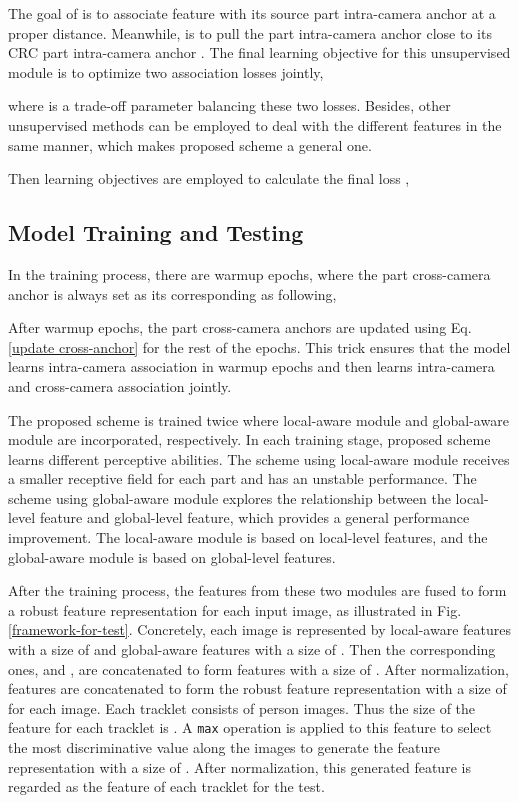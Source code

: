 \documentclass{cta-author}
\begin{document}
	The goal of  is to associate feature  with its source part intra-camera anchor  at a proper distance. Meanwhile,  is to pull the part intra-camera anchor  close to its CRC part intra-camera anchor . The final learning objective for this unsupervised module is to optimize two association losses jointly,
	
	where  is a trade-off parameter balancing these two losses. Besides, other unsupervised methods can be employed to deal with the different features  in the same manner, which makes proposed scheme a general one. 
	
	Then  learning objectives  are employed to calculate the final loss ,
	
		
	\subsection{Model Training and Testing} \label{model training and testing}
	In the training process, there are  warmup epochs, where the part cross-camera anchor  is always set as its corresponding  as following,
	
	After  warmup epochs, the part cross-camera anchors are updated using Eq. \ref{update cross-anchor} for the rest of the epochs. This trick ensures that the model learns intra-camera association in warmup epochs and then learns intra-camera and cross-camera association jointly. 
	
	The proposed scheme is trained twice where local-aware module and global-aware module are incorporated, respectively. In each training stage, proposed scheme learns different perceptive abilities. The scheme using local-aware module receives a smaller receptive field for each part and has an unstable performance. The scheme using global-aware module explores the relationship between the local-level feature and global-level feature, which provides a general performance improvement. The local-aware module is based on local-level features, and the global-aware module is based on global-level features. 
	
	After the training process, the features from these two modules are fused to form a robust feature representation for each input image, as illustrated in Fig. \ref{framework-for-test}. Concretely, each image is represented by  local-aware features with a size of  and  global-aware features with a size of . Then the corresponding ones,  and , are concatenated to form  features  with a size of . After normalization,  features  are concatenated to form the robust feature representation with a size of  for each image. Each tracklet consists of  person images. Thus the size of the feature for each tracklet is . A \texttt{max} operation is applied to this feature to select the most discriminative value along the  images to generate the feature representation with a size of . After normalization, this generated feature is regarded as the feature of each tracklet for the test.
	
\end{document}
